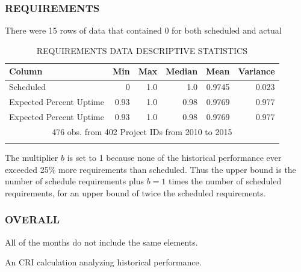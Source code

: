 \documentclass[SDSUThesis.tex]{subfiles}
\begin{document}
        \subsubsection{REQUIREMENTS}
        \label{sec:case-req}
            There were 15 rows of data that contained 0 for both
            scheduled and actual
            \begin{longtable}{@{}l rr rrr}
                \toprule%
                 \centering%
                 {\bfseries Column}
                 & {\bfseries Min}
                 & {\bfseries Max}
                 & {\bfseries Median}
                 & {\bfseries Mean}
                 & {\bfseries Variance} \\
                
                \cmidrule[0.2pt](r{0.125em}){1-1}%
                \cmidrule[0.2pt](lr{0.125em}){2-2}%
                \cmidrule[0.2pt](l{0.125em}){3-3}%
                \cmidrule[0.2pt](l{0.125em}){4-4}%
                \cmidrule[0.2pt](l{0.125em}){5-5}%
                \endhead
                
                Scheduled & 0 & 1.0 & 1.0 & 0.9745 & 0.023 \\
                \myrowcolour%
                Expected Percent Uptime & 0.93 & 1.0 & 0.98 & 0.9769  & 0.977\\
                Expected Percent Uptime & 0.93 & 1.0 & 0.98 & 0.9769  & 0.977\\
                
                \bottomrule
                
                \multicolumn{6}{c}{476 obs. from 402 Project IDs from 2010 to 2015} \\
                
                \caption{REQUIREMENTS DATA DESCRIPTIVE STATISTICS}
                \label{tab:requirements_desc}
            \end{longtable}
            
            The multiplier $b$ is set to 1 because none of the historical performance
            ever exceeded 25\% more requirements than scheduled. Thus the upper
            bound is the number of schedule requirements plus $b=1$ times
            the number of scheduled requirements, for an upper bound of twice
            the scheduled requirements.
            
        \subsubsection{OVERALL}
            All of the months do not include the same elements.  
    
    An CRI calculation analyzing historical performance.


\end{document}
